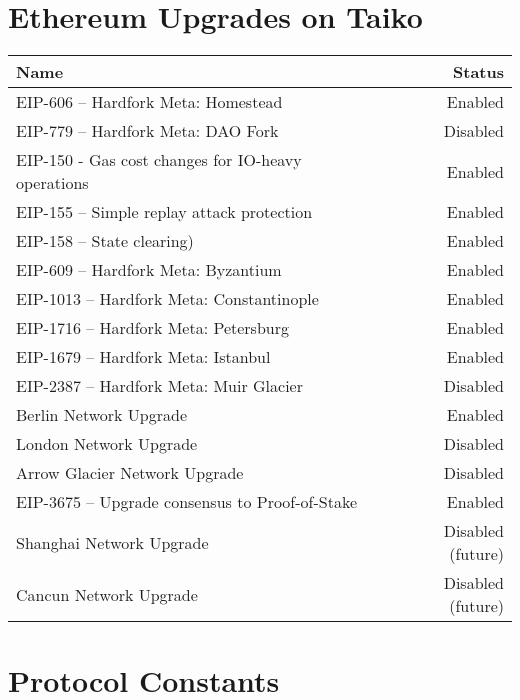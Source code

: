 \documentclass[9pt,oneside]{amsart}
\begin{document}
\section{Ethereum Upgrades on Taiko}\label{sec:hardforks}

\begin{tabu}{l r }
\toprule
Name & Status \\
\midrule
EIP-606 -- Hardfork Meta: Homestead & \quad \quad \quad \quad \quad \quad \quad \quad \quad \quad \quad \quad \quad \quad \quad \quad \quad \quad \quad \quad \quad \quad  Enabled \\
EIP-779 -- Hardfork Meta: DAO Fork & Disabled \\
EIP-150 - Gas cost changes for IO-heavy operations & Enabled \\
EIP-155 -- Simple replay attack protection &  Enabled \\
EIP-158 -- State clearing) & Enabled \\
EIP-609 -- Hardfork Meta: Byzantium & Enabled \\
EIP-1013 -- Hardfork Meta: Constantinople & Enabled \\
EIP-1716 -- Hardfork Meta: Petersburg & Enabled \\
EIP-1679 -- Hardfork Meta: Istanbul & Enabled \\
EIP-2387 -- Hardfork Meta: Muir Glacier & Disabled \\
Berlin Network Upgrade & Enabled \\
London Network Upgrade & Disabled \\
Arrow Glacier Network Upgrade & Disabled \\
EIP-3675 -- Upgrade consensus to Proof-of-Stake & Enabled \\
Shanghai Network Upgrade & Disabled (future) \\
Cancun Network Upgrade & Disabled (future)  \\
\bottomrule
\end{tabu}



\section{Protocol Constants}\label{sec:constants1}
\end{document}
